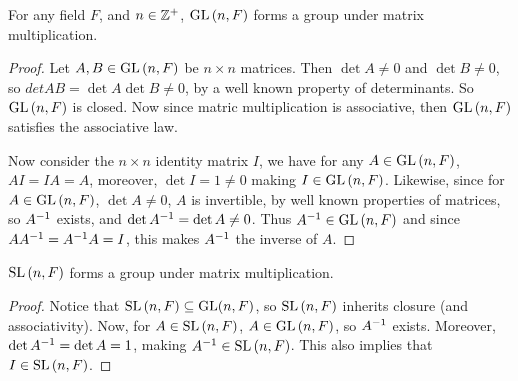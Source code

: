 \begin{theorem}\label{theorem_1.4.1}
  For any field $F$, and  $n \in \mathbb{Z}^+$, $\operatorname{GL}{(n,F)}$ forms a group under matrix
  multiplication.
\end{theorem}
\begin{proof}
  Let $A,B \in \operatorname{GL}{(n,F)}$ be $n \times n$ matrices. Then  $\det{A} \neq 0$ and
  $\det{B} \neq 0$, so $det{AB}=\det{A}\det{B} \neq 0$, by a well known
  property of determinants. So $\operatorname{GL}{(n,F)}$ is closed. Now since matric
  multiplication is associative, then $\operatorname{GL}{(n,F)}$ satisfies the associative
  law.

  Now consider the $n \times n$ identity matrix $I$, we have for any $A \in
  \operatorname{GL}{(n,F)}$, $AI=IA=A$, moreover,  $\det{I}=1 \neq 0$ making $I \in
  \operatorname{GL}{(n,F)}$. Likewise, since for $A \in \operatorname{GL}{(n,F)}$, $\det{A} \neq 0$, $A$ is
  invertible, by well known properties of matrices, so  $A^{-1}$ exists, and
  $\det{A^{-1}}=\det{A} \neq 0$. Thus $A^{-1} \in \operatorname{GL}{(n,F)}$ and since
  $AA^{-1}=A^{-1}A=I$, this makes $A^{-1}$ the inverse of $A$.
\end{proof}
\begin{corollary}
  $\operatorname{SL}{(n,F)}$ forms a group under matrix multiplication.
\end{corollary}
\begin{proof}
  Notice that $\operatorname{SL}{(n,F)} \subseteq \operatorname{GL}(n,F)$, so $\operatorname{SL}{(n,F)}$ inherits closure (and
  associativity). Now, for $A \in \operatorname{SL}{(n,F)}$, $A \in \operatorname{GL}{(n,F)}$, so $A^{-1}$
  exists. Moreover, $\det{A^{-1}}=\det{A}=1$, making $A^{-1} \in \operatorname{SL}{(n,F)}$.
  This also implies that $I \in \operatorname{SL}{(n,F)}$.
\end{proof}

